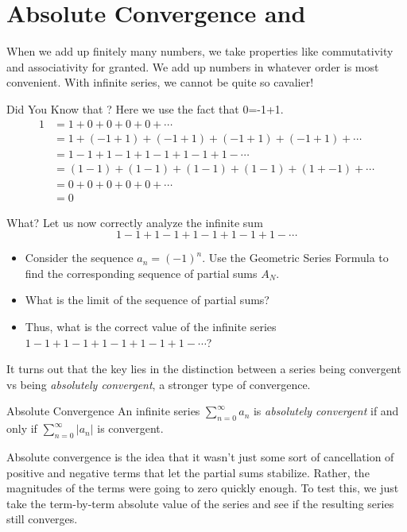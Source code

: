 \section{Absolute Convergence and }
When we add up finitely many numbers, we take properties like commutativity and associativity for granted.  We add up numbers in whatever order is most convenient.  With infinite series, we cannot be quite so cavalier!

\begin{example}{Did You Know that ?}
Here we use the fact that 0=-1+1.
\begin{align*}
1&=1+0+0+0+0+\cdots \\
 &=1+(-1+1)+(-1+1)+(-1+1)+(-1+1)+\cdots \\
 &=1-1+1-1+1-1+1-1+1-\cdots \\
 &=(1-1)+(1-1)+(1-1)+(1-1)+(1+-1)+\cdots \\
&=0+0+0+0+0+\cdots\\
&=0
\end{align*}
\end{example}

\begin{exercise}{What? \Coffeecup \Coffeecup \Coffeecup}
Let us now correctly analyze the infinite sum $$1-1+1-1+1-1+1-1+1-\cdots $$ 

\begin{itemize}
\item Consider the sequence $a_n=(-1)^n$.  Use the Geometric Series Formula to find the corresponding sequence of partial sums $A_N$.
\item What is the limit of the sequence of partial sums?
\item Thus, what is the correct value of the infinite series $1-1+1-1+1-1+1-1+1-\cdots$? 
\end{itemize}
\end{exercise}

It turns out that the key lies in the distinction between a series being convergent vs being \emph{absolutely convergent}, a stronger type of convergence.

\begin{definition}{Absolute Convergence }
An infinite series $\sum_{n=0}^\infty a_n$ is \emph{absolutely convergent} if and only if $\sum_{n=0}^\infty \left| a_n \right|$ is convergent.
\end{definition}
Absolute convergence is the idea that it wasn't just some sort of cancellation of positive and negative terms that let the partial sums stabilize.  Rather, the magnitudes of the terms were going to zero quickly enough.  To test this, we just take the term-by-term absolute value of the series and see if the resulting series still converges. 

